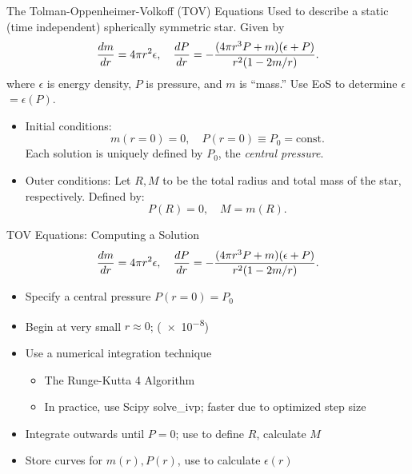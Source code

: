 \documentclass[handout]{beamer}
\newcommand{\code}[1]{{\fontfamily{pcr}\selectfont #1}}
\newcommand{\Def}{\equiv}
\begin{document}
    \begin{frame}{The Tolman-Oppenheimer-Volkoff (TOV) Equations}
        \pause Used to describe a static (time independent) spherically symmetric star. \pause Given by
        \begin{align*}
            \dv{m}{r} = 4\pi r^2 \epsilon, \quad \dv{P}{r} = -\frac{(4\pi r^3 P + m)(\epsilon + P)}{r^2 (1-2m/r)}.
        \end{align*}
        where $\epsilon$ is energy density, $P$ is pressure, and $m$ is ``mass.'' \pause Use EoS to determine $\epsilon~$\pause $=\epsilon(P)$. \pause 
        \medskip
        
        \begin{itemize}
            \item Initial conditions: \pause
            \[m(r=0) = 0, \quad P(r=0) \Def P_0 = \text{const.}\]\pause
            Each solution is uniquely defined by $P_0$, the \textit{central pressure}.
            \item Outer conditions: Let $R,M$ to be the total radius and total mass of the star, respectively. Defined by:
            \[P(R) = 0, \quad M = m(R).\]
        \end{itemize}
    \end{frame}

    \begin{frame}{TOV Equations: Computing a Solution}
        \begin{align*}
            \dv{m}{r} = 4\pi r^2 \epsilon, \quad \dv{P}{r} = -\frac{(4\pi r^3 P + m)(\epsilon + P)}{r^2 (1-2m/r)}.
        \end{align*}
        \begin{itemize}
            \item Specify a central pressure $P(r=0) = P_0$
            \item Begin at very small $r \approx 0$; (\SI{e-8}{})
            \item Use a numerical integration technique
            \begin{itemize}
                \item The Runge-Kutta 4 Algorithm
                \item In practice, use Scipy \code{solve\_ivp}; faster due to optimized step size
            \end{itemize}
            \item Integrate outwards until $P = 0$; use to define $R$, calculate $M$
            \item Store curves for $m(r), P(r)$, use to calculate $\epsilon(r)$
        \end{itemize}
    \end{frame}
\end{document}
